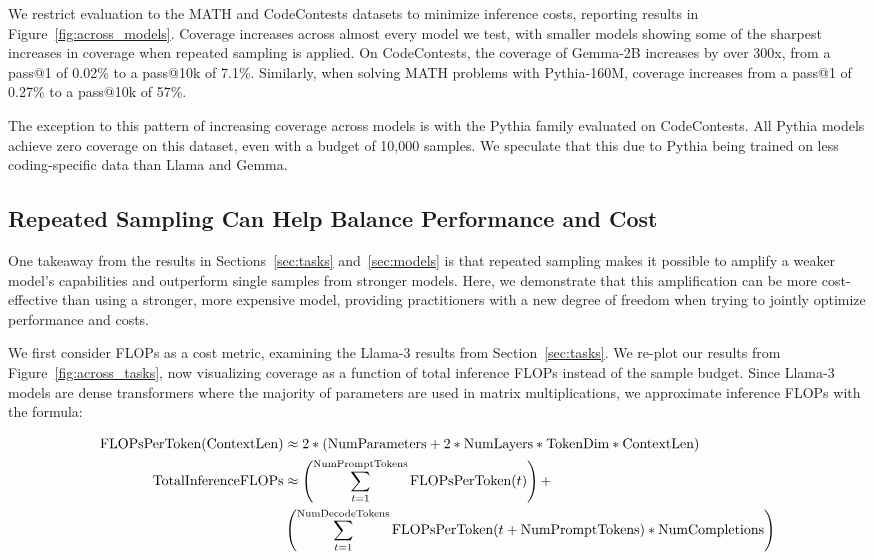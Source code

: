 \documentclass[11pt]{article}
\begin{document}
We restrict evaluation to the MATH and CodeContests datasets to minimize inference costs, reporting results in Figure~\ref{fig:across_models}. Coverage increases across almost every model we test, with smaller models showing some of the sharpest increases in coverage when repeated sampling is applied. On CodeContests, the coverage of Gemma-2B increases by over 300x, from a pass@1 of 0.02\% to a pass@10k of 7.1\%. 
Similarly, when solving MATH problems with Pythia-160M, coverage increases from a pass@1 of 0.27\% to a pass@10k of 57\%.

The exception to this pattern of increasing coverage across models is with the Pythia family evaluated on CodeContests. All Pythia models achieve zero coverage on this dataset, even with a budget of 10,000 samples. We speculate that this due to Pythia being trained on less coding-specific data than Llama and Gemma. 

\subsection{Repeated Sampling Can Help Balance Performance and Cost}
\label{sec:tradeoffs}


One takeaway from the results in Sections~\ref{sec:tasks} and~\ref{sec:models} is that repeated sampling makes it possible to amplify a weaker model's capabilities and outperform single samples from stronger models. 
Here, we demonstrate that this amplification can be more cost-effective than using a stronger, more expensive model, providing practitioners with a new degree of freedom when trying to jointly optimize performance and costs.

We first consider FLOPs as a cost metric, examining the Llama-3 results from Section~\ref{sec:tasks}. We re-plot our results from Figure~\ref{fig:across_tasks}, now visualizing coverage as a function of total inference FLOPs instead of the sample budget. Since Llama-3 models are dense transformers where the majority of parameters are used in matrix multiplications, we approximate inference FLOPs with the formula:

\small{
\begin{align*}
    \text{FLOPsPerToken}(\text{ContextLen}) &\approx 2 * \left(  \text{NumParameters} + 2 * \text{NumLayers} * \text{TokenDim} * \text{ContextLen} \right)\\
    \text{TotalInferenceFLOPs} &\approx \left( \sum_{t=1}^{\text{NumPromptTokens}} \text{FLOPsPerToken} (t) \right) + \\ &\left( \sum_{t=1}^{\text{NumDecodeTokens}} \text{FLOPsPerToken} (t+ \text{NumPromptTokens}) * \text{NumCompletions} \right)\\
\end{align*}
}
\end{document}
